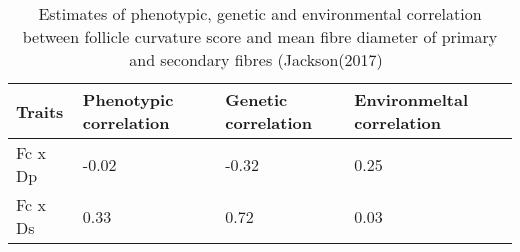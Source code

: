 %

\begin{table}[htp]
\centering
\caption{Estimates of phenotypic, genetic and environmental correlation between follicle curvature score and mean fibre diameter of primary and secondary fibres (Jackson(2017)~\cite{jackson-2017}}
\label{tab:fcdpds}
\vspace{0.1in}
\begin{tabular}{|p{2.0in}|p{1.0in}|p{1.0in}|p{1.0in}|}  \hline
 Traits  & Phenotypic correlation  &  Genetic correlation & Environmeltal correlation  \\ 
\hline 
Fc x Dp & -0.02 & -0.32 & 0.25 \\
Fc x Ds    & 0.33 & 0.72 & 0.03 \\
\hline

\end{tabular}
\end{table}

%
